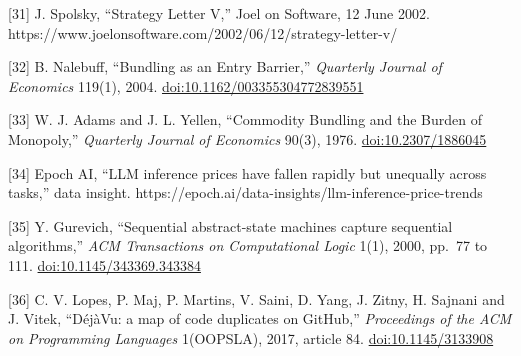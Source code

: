 \documentclass[
  10pt,
]{article}
\begin{document}
{[}31{]} J. Spolsky, ``Strategy Letter V,'' Joel on Software, 12 June
2002. https://www.joelonsoftware.com/2002/06/12/strategy-letter-v/

{[}32{]} B. Nalebuff, ``Bundling as an Entry Barrier,'' \emph{Quarterly
Journal of Economics} 119(1), 2004.
\href{https://doi.org/10.1162/003355304772839551}{doi:10.1162/003355304772839551}

{[}33{]} W. J. Adams and J. L. Yellen, ``Commodity Bundling and the
Burden of Monopoly,'' \emph{Quarterly Journal of Economics} 90(3), 1976.
\href{https://doi.org/10.2307/1886045}{doi:10.2307/1886045}

{[}34{]} Epoch AI, ``LLM inference prices have fallen rapidly but
unequally across tasks,'' data insight.
https://epoch.ai/data-insights/llm-inference-price-trends

{[}35{]} Y. Gurevich, ``Sequential abstract-state machines capture
sequential algorithms,'' \emph{ACM Transactions on Computational Logic}
1(1), 2000, pp.~77 to 111.
\href{https://doi.org/10.1145/343369.343384}{doi:10.1145/343369.343384}

{[}36{]} C. V. Lopes, P. Maj, P. Martins, V. Saini, D. Yang, J. Zitny,
H. Sajnani and J. Vitek, ``DéjàVu: a map of code duplicates on GitHub,''
\emph{Proceedings of the ACM on Programming Languages} 1(OOPSLA), 2017,
article 84. \href{https://doi.org/10.1145/3133908}{doi:10.1145/3133908}
\end{document}
